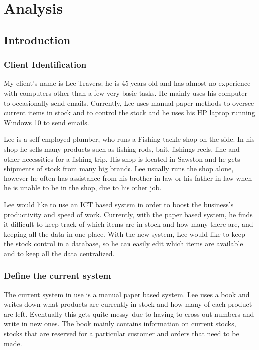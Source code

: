 \chapter{Analysis}

\section{Introduction}

\subsection{Client Identification}
My client's name is Lee Travers; he is 45 years old and has almost no experience with computers other than a few very basic tasks. He mainly uses his computer to occasionally send emails. Currently, Lee uses manual paper methods to oversee current items in stock and to control the stock and he uses his HP laptop running Windows 10 to send emails.

Lee is a self employed plumber, who runs a Fishing tackle shop on the side. In his shop he sells many products such as fishing rods, bait, fishings reels, line and other necessities for a fishing trip. His shop is located in Sawston and he gets shipments of stock from many big brands. Lee usually runs the shop alone, however he often has assistance from his brother in law or his father in law when he is unable to be in the shop, due to his other job.

Lee would like to use an ICT based system in order to boost the business's productivity and speed of work. Currently, with the paper based system, he finds it difficult to keep track of which items are in stock and how many there are, and keeping all the data in one place. With the new system, Lee would like to keep the stock control in a database, so he can easily edit which items are available and to keep all the data centralized.
\subsection{Define the current system}
The current system in use is a manual paper based system. Lee uses a book and writes down what products are currently in stock and how many of each product are left. Eventually this gets quite messy, due to having to cross out numbers and write in new ones. The book mainly contains information on current stocks, stocks that are reserved for a particular customer and orders that need to be made.

